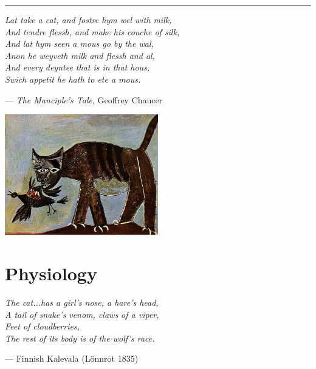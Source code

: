 \documentclass{article}
\begin{document}
\begin{center}\rule{0.5\textwidth}{0.1mm}\end{center}

\begin{multicols}{2}
    \begin{minipage}{0.5\textwidth}
        \begin{flushleft}
            \emph{Lat take a cat, and fostre hym wel with milk,\\
        And tendre flessh, and make his couche of silk,\\
        And lat hym seen a mous go by the wal,\\
        Anon he weyveth milk and flessh and al,\\
        And every deyntee that is in that hous,\\
        Swich appetit he hath to ete a mous.
        }
        \end{flushleft}
        \begin{flushright}--- \emph{The Manciple's Tale}, Geoffrey Chaucer\end{flushright}
    \end{minipage}
    \begin{minipage}{0.5\textwidth}
        \centering
        \includegraphics[width=0.5\textwidth]{img/picasso-cat.png}
    \end{minipage}
\end{multicols}

\dotfill

\section*{Physiology}
\begin{flushright}
\begin{minipage}{8cm}
    \begin{flushleft}
        \emph{The cat...has a girl's nose, a hare's head,\\
            A tail of snake's venom, claws of a viper,\\
            Feet of cloudberries,\\
            The rest of its body is of the wolf's race.}
    \end{flushleft}
    \begin{flushright}--- Finnish Kalevala (L\"onnrot 1835)\end{flushright}
\end{minipage}
\end{flushright}
\end{document}
